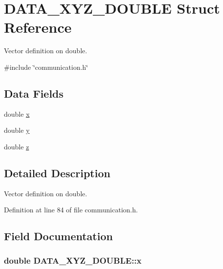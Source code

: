 \hypertarget{structDATA__XYZ__DOUBLE}{\section{D\-A\-T\-A\-\_\-\-X\-Y\-Z\-\_\-\-D\-O\-U\-B\-L\-E Struct Reference}
\label{structDATA__XYZ__DOUBLE}
}


Vector definition on double.  




{\ttfamily \#include \char`\"{}communication.\-h\char`\"{}}

\subsection*{Data Fields}
\begin{DoxyCompactItemize}
\item 
double \hyperlink{structDATA__XYZ__DOUBLE_a22868cc99a423900e7b82d015a5eb91f}{x}
\item 
double \hyperlink{structDATA__XYZ__DOUBLE_a198a27b5df3b5b0bf461b0e481e22a82}{y}
\item 
double \hyperlink{structDATA__XYZ__DOUBLE_a9556e8868c223ff3e28756ea18a284c0}{z}
\end{DoxyCompactItemize}


\subsection{Detailed Description}
Vector definition on double. 

Definition at line 84 of file communication.\-h.



\subsection{Field Documentation}
\hypertarget{structDATA__XYZ__DOUBLE_a22868cc99a423900e7b82d015a5eb91f}{
\subsubsection[{x}]{\setlength{\rightskip}{0pt plus 5cm}double D\-A\-T\-A\-\_\-\-X\-Y\-Z\-\_\-\-D\-O\-U\-B\-L\-E\-::x}}\label{structDATA__XYZ__DOUBLE_a22868cc99a423900e7b82d015a5eb91f}


